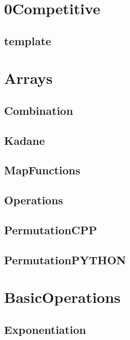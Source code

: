 \section{0Competitive}
\subsection{ template}
\raggedbottom
\hrulefill

\section{Arrays}
\subsection{ Combination}
\raggedbottom
\hrulefill
\subsection{ Kadane}
\raggedbottom
\hrulefill
\subsection{ MapFunctions}
\raggedbottom
\hrulefill
\subsection{ Operations}
\raggedbottom
\hrulefill
\subsection{ PermutationCPP}
\raggedbottom
\hrulefill
\subsection{ PermutationPYTHON}
\raggedbottom
\hrulefill

\section{BasicOperations}
\subsection{ Exponentiation}
\raggedbottom
\hrulefill
